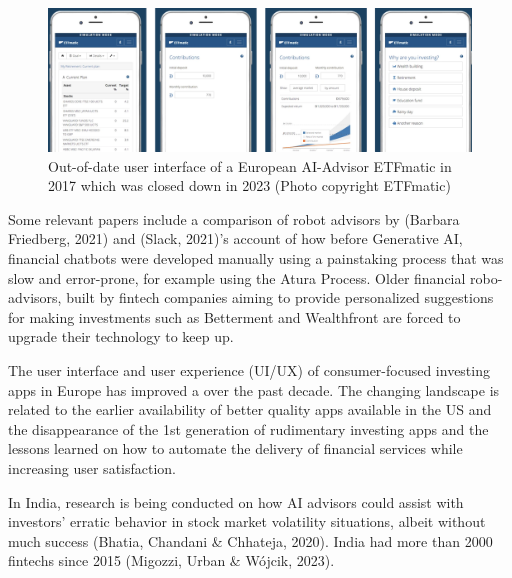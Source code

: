 \documentclass[
  letterpaper,
  DIV=11,
  numbers=noendperiod]{scrartcl}
\begin{document}
\begin{figure}[H]

{\centering \includegraphics[width=1\textwidth,height=\textheight]{./images/ai/etfmatic.png}

}

\caption{Out-of-date user interface of a European AI-Advisor ETFmatic in
2017 which was closed down in 2023 (Photo copyright ETFmatic)}

\end{figure}%

Some relevant papers include a comparison of robot advisors by (Barbara
Friedberg, 2021) and (Slack, 2021)'s account of how before Generative
AI, financial chatbots were developed manually using a painstaking
process that was slow and error-prone, for example using the Atura
Process. Older financial robo-advisors, built by fintech companies
aiming to provide personalized suggestions for making investments such
as Betterment and Wealthfront are forced to upgrade their technology to
keep up.

The user interface and user experience (UI/UX) of consumer-focused
investing apps in Europe has improved a over the past decade. The
changing landscape is related to the earlier availability of better
quality apps available in the US and the disappearance of the 1st
generation of rudimentary investing apps and the lessons learned on how
to automate the delivery of financial services while increasing user
satisfaction.

In India, research is being conducted on how AI advisors could assist
with investors' erratic behavior in stock market volatility situations,
albeit without much success (Bhatia, Chandani \& Chhateja, 2020). India
had more than 2000 fintechs since 2015 (Migozzi, Urban \& Wójcik, 2023).
\end{document}
